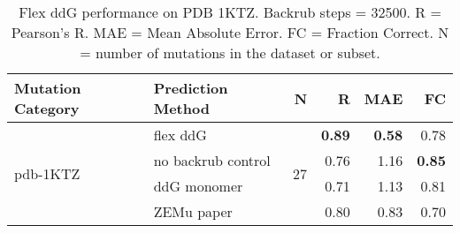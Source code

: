 \begin{table}
  \begin{tabular}{llrrrr}
\toprule
Mutation Category &   Prediction Method &   N &    R &  MAE &   FC \\
\midrule
 \multirow{ 4}{*}{pdb-1KTZ} & flex ddG & \multirow{ 4}{*}{27} & \textbf{0.89} & \textbf{0.58} & 0.78  \\
 & no backrub control & & 0.76 & 1.16 & \textbf{0.85}  \\
 & ddG monomer & & 0.71 & 1.13 & 0.81  \\
 & ZEMu paper & & 0.80 & 0.83 & 0.70  \\
\bottomrule
\end{tabular}
  \caption[Flex ddG performance on PDB 1KTZ]{
    Flex ddG performance on PDB 1KTZ. Backrub steps = 32500. R = Pearson's R. MAE = Mean Absolute Error. FC = Fraction Correct. N = number of mutations in the dataset or subset.
  } \label{tab:table-pdb-1KTZ}
\end{table}
